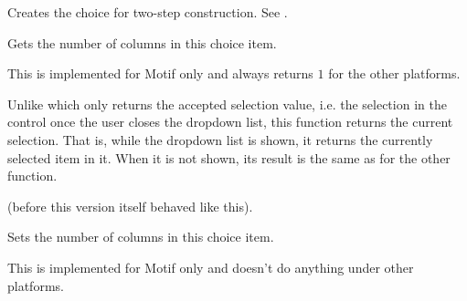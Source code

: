 \label{wxchoicecreate}



Creates the choice for two-step construction. See .


\label{wxchoicegetcolumns}


Gets the number of columns in this choice item.


This is implemented for Motif only and always returns $1$ for the other
platforms.


\label{wxchoicegetcurrentselection}


Unlike  which only
returns the accepted selection value, i.e. the selection in the control once
the user closes the dropdown list, this function returns the current selection.
That is, while the dropdown list is shown, it returns the currently selected
item in it. When it is not shown, its result is the same as for the other
function.

 (before this version
 itself behaved like
this).


\label{wxchoicesetcolumns}


Sets the number of columns in this choice item.




This is implemented for Motif only and doesn't do anything under other
platforms.

